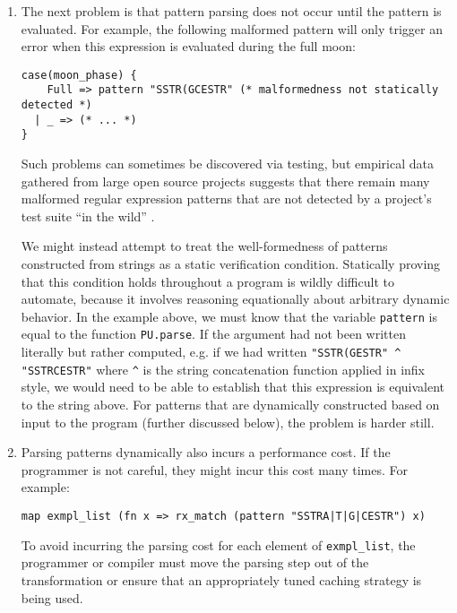 \begin{enumerate}
\item The next problem is that pattern parsing does not occur until the pattern is evaluated. For example, the following malformed pattern will only trigger an error when this expression is evaluated during the full moon: %

\begin{lstlisting}[numbers=none]
case(moon_phase) {
    Full => pattern "SSTR(GCESTR" (* malformedness not statically detected *)
  | _ => (* ... *)
}
\end{lstlisting}
Such problems can sometimes be discovered via testing, but empirical data gathered from large open source projects suggests that there remain many malformed regular expression patterns that are not detected by a project's test suite ``in the wild'' \cite{spishak2012type}. 

We might instead attempt to treat the well-formedness of patterns constructed from strings as a static verification condition. Statically proving that this condition holds throughout a program is wildly difficult to automate, because it involves reasoning equationally about arbitrary dynamic behavior. In the example above, we must know that the variable \lstinline{pattern} is equal to the function \lstinline{PU.parse}. If the argument had not been written literally but rather computed, e.g. if we had written \lstinline{"SSTR(GESTR" ^ "SSTRCESTR"} where \lstinline{^} is the string concatenation function applied in infix style, we would need to be able to establish that this expression is equivalent to the string above. For patterns that are dynamically constructed based on input to the program (further discussed below), the problem is harder still.

\item Parsing patterns dynamically also incurs a performance cost. If the programmer is not careful, they might  incur this cost many times. For example:
\begin{lstlisting}[numbers=none]
map exmpl_list (fn x => rx_match (pattern "SSTRA|T|G|CESTR") x)
\end{lstlisting}
To avoid incurring the parsing cost for each element of \lstinline{exmpl_list}, the programmer or compiler must move the parsing step out of the transformation or ensure that an appropriately tuned caching strategy is being used. %


\end{enumerate}
